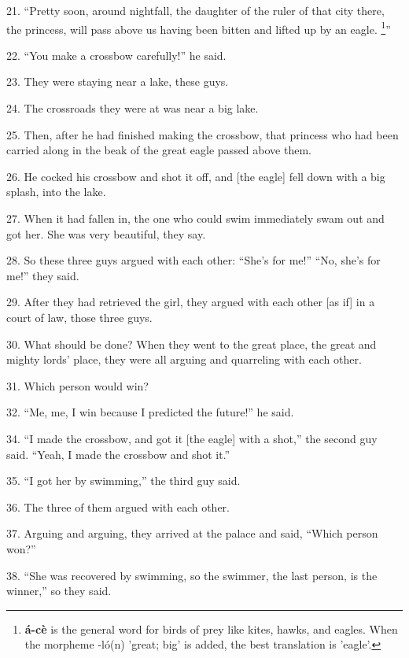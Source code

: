 21. ``Pretty soon, around nightfall, the daughter of the ruler of that city there,
the princess, will pass above us having been bitten and lifted up by an eagle.
\footnote{\textbf{á-cè} is the general word for birds of prey like kites, hawks, and eagles. When the morpheme -ló(n) 'great; big' is added, the best translation is 'eagle'.}''

22. ``You make a crossbow carefully!'' he said.

23. They were staying near a lake, these guys.

24. The crossroads they were at was near a big lake.

25. Then, after he had finished making the crossbow, that princess who had been
carried along in the beak of the great eagle passed above them.

26. He cocked his crossbow and shot it off, and [the eagle] fell down with a big
splash, into the lake.

27. When it had fallen in, the one who could swim immediately swam out and got
her. She was very beautiful, they say.

28. So these three guys argued with each other: ``She's for me!'' ``No, she's for
me!'' they said.

29. After they had retrieved the girl, they argued with each other [as if] in a
court of law, those three guys.

30. What should be done? When they went to the great place, the great and mighty
lords' place, they were all arguing and quarreling with each other.

31. Which person would win?

32. ``Me, me, I win because I predicted the future!'' he said.

34. ``I made the crossbow, and got it [the eagle] with a shot,'' the second guy
said. ``Yeah, I made the crossbow and shot it.''

35. ``I got her by swimming,'' the third guy said.

36. The three of them argued with each other.

37. Arguing and arguing, they arrived at the palace and said, ``Which person won?''

38. ``She was recovered by swimming, so the swimmer, the last person, is the winner,''
so they said.

